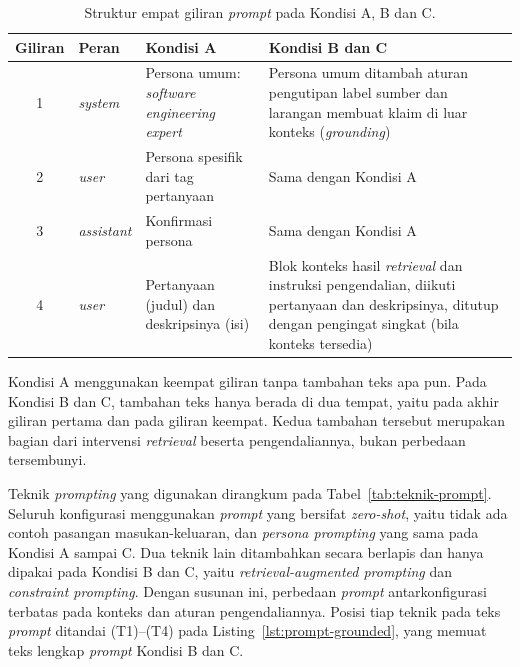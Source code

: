 \begin{table}[!htbp]
\centering
\small
\caption{Struktur empat giliran \emph{prompt} pada Kondisi A, B dan C.}
\label{tab:struktur-prompt}
\renewcommand{\arraystretch}{1.2}
\begin{tabularx}{\textwidth}{|c|l|>{\raggedright\arraybackslash}p{3.7cm}|>{\raggedright\arraybackslash}X|}
\hline
\textbf{Giliran} & \textbf{Peran} & \textbf{Kondisi A} & \textbf{Kondisi B dan C} \\
\hline
1 & \emph{system} & Persona umum: \emph{software engineering expert} & Persona umum ditambah aturan pengutipan label sumber dan larangan membuat klaim di luar konteks (\emph{grounding}) \\
\hline
2 & \emph{user} & Persona spesifik dari tag pertanyaan & Sama dengan Kondisi A \\
\hline
3 & \emph{assistant} & Konfirmasi persona & Sama dengan Kondisi A \\
\hline
4 & \emph{user} & Pertanyaan (judul) dan deskripsinya (isi) & Blok konteks hasil \emph{retrieval} dan instruksi pengendalian, diikuti pertanyaan dan deskripsinya, ditutup dengan pengingat singkat (bila konteks tersedia) \\
\hline
\end{tabularx}
\end{table}

Kondisi A menggunakan keempat giliran tanpa tambahan teks apa pun. Pada Kondisi B dan C, tambahan teks hanya berada di dua tempat, yaitu pada akhir giliran pertama dan pada giliran keempat. Kedua tambahan tersebut merupakan bagian dari intervensi \emph{retrieval} beserta pengendaliannya, bukan perbedaan tersembunyi.

Teknik \emph{prompting} yang digunakan dirangkum pada Tabel~\ref{tab:teknik-prompt}. Seluruh konfigurasi menggunakan \emph{prompt} yang bersifat \emph{zero-shot}, yaitu tidak ada contoh pasangan masukan-keluaran, dan \emph{persona prompting} yang sama pada Kondisi A sampai C. Dua teknik lain ditambahkan secara berlapis dan hanya dipakai pada Kondisi B dan C, yaitu \emph{retrieval-augmented prompting} dan \emph{constraint prompting}. Dengan susunan ini, perbedaan \emph{prompt} antarkonfigurasi terbatas pada konteks dan aturan pengendaliannya. Posisi tiap teknik pada teks \emph{prompt} ditandai (T1)--(T4) pada Listing~\ref{lst:prompt-grounded}, yang memuat teks lengkap \emph{prompt} Kondisi B dan C.

